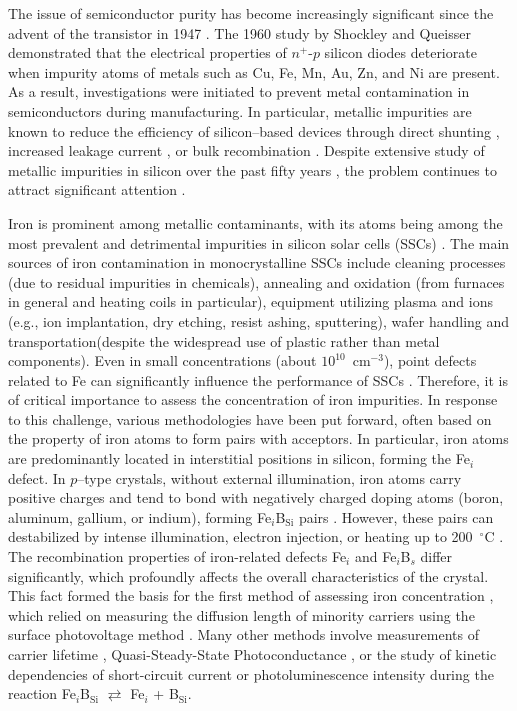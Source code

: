 \documentclass[a4paper,fleqn]{cas-sc}
\begin{document}
The issue of semiconductor purity has become increasingly significant since the advent of the transistor in 1947 \cite{Claers2018}.
The 1960 study by Shockley and Queisser \cite{Goetzberger1960} demonstrated that
the electrical properties of $n^{+}$-$p$ silicon diodes deteriorate when impurity atoms of metals such as Cu, Fe, Mn, Au, Zn, and Ni are present.
As a result, investigations were initiated to prevent metal contamination in semiconductors during manufacturing.
In particular, metallic impurities are known to reduce the efficiency of
silicon--based devices through direct shunting \cite{Rsh:Breitenstein},
increased leakage current \cite{Lee1980},
or bulk recombination \cite{Istratov2000}.
Despite extensive study of metallic impurities in silicon over the past fifty years \cite{Claers2018,Pearce1977},
the problem continues to attract significant attention \cite{Hajjiah2020,Le2024,Maoudj2021,OlikhPSSA,LaineIEEEPV2016}.


Iron is prominent among metallic contaminants, with its atoms being among
the most prevalent and detrimental impurities in silicon solar cells (SSCs) \cite{Buonassisi2006}.
The main sources of iron contamination in monocrystalline SSCs include \cite{Istratov2000, Abbott2014}
cleaning processes (due to residual impurities in chemicals),
annealing and oxidation (from furnaces in general and heating coils in particular),
equipment utilizing plasma and ions (e.g., ion implantation, dry etching, resist ashing, sputtering),
wafer handling and transportation(despite the widespread use of plastic rather than metal components).
Even in small concentrations (about $10^{10}$~cm$^{-3}$),
point defects related to Fe can significantly influence the performance of SSCs \cite{IronSC,Herguth2022}.
Therefore, it is of critical importance to assess the concentration of iron impurities.
In response to this challenge, various methodologies have been put forward,
often based on the property of iron atoms to form pairs with acceptors.
In particular, iron atoms are predominantly located in interstitial positions in silicon, forming the Fe$_i$ defect.
In $p$--type crystals, without external illumination, iron atoms carry positive charges and tend to bond with negatively charged doping atoms
(boron, aluminum, gallium, or indium), forming Fe$_i$B$_\mathrm{Si}$ pairs \cite{Kimerling1983}.
However, these pairs can destabilized by intense illumination, electron injection, or heating up to 200~$^\circ$C \cite{FeBAssJAP2014}.
The recombination properties of iron-related defects Fe$_i$ and Fe$_i$B$_s$ differ significantly,
which profoundly affects the overall characteristics of the crystal.
This fact formed the basis for the first method of assessing iron concentration \cite{Zoth1990},
which relied on measuring the diffusion length of minority carriers using the surface photovoltage method \cite{Tousek2008}.
Many other methods involve measurements of carrier lifetime \cite{Rein2,Schmidt2005},
Quasi-Steady-State Photoconductance \cite{Goodarzi2017},
or the study of kinetic dependencies of short-circuit current \cite{Olikh2021JAP}
or photoluminescence intensity \cite{FeMethod2012} during the reaction Fe$_i$B$_\mathrm{Si}$ $\rightleftarrows$ Fe$_i$ + B$_\mathrm{Si}$.
\end{document}
